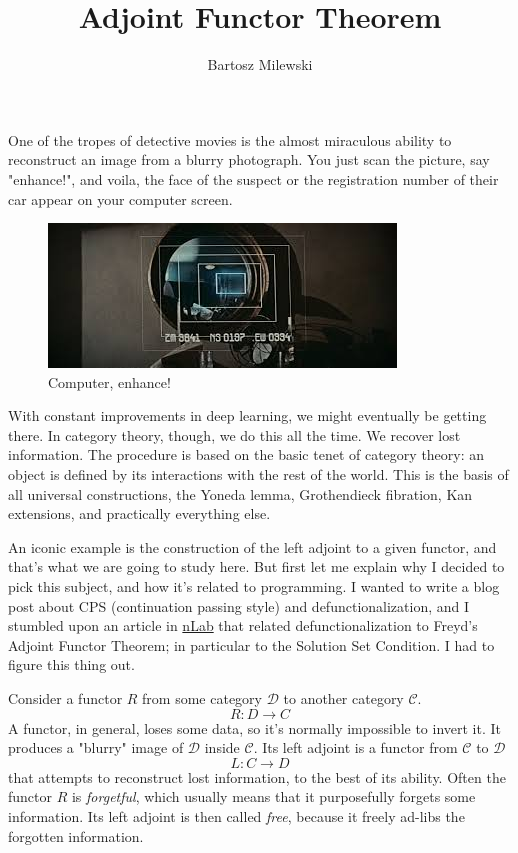 \documentclass[11pt]{amsart}
\author{Bartosz Milewski}
\title{Adjoint Functor Theorem}
\begin{document}
\maketitle{}

One of the tropes of detective movies is the almost miraculous ability to reconstruct an image from a blurry photograph. You just scan the picture,  say "enhance!", and voila, the face of the suspect or the registration number of their car appear on your computer screen. 

\begin{figure}[h]
\includegraphics{BladeRunner.jpeg}
\caption{Computer, enhance!}
\end{figure}

With constant improvements in deep learning, we might eventually be getting there. In category theory, though, we do this all the time. We recover lost information. The procedure is based on the basic tenet of category theory: an object is defined by its interactions with the rest of the world. This is the basis of all universal constructions, the Yoneda lemma, Grothendieck fibration, Kan extensions, and practically everything else. 

An iconic example is the construction of the left adjoint to a given functor, and that's what we are going to study here. But first let me explain why I decided to pick this subject, and how it's related to programming. I wanted to write a blog post about CPS (continuation passing style) and defunctionalization, and I stumbled upon an article in \href{https://ncatlab.org/nlab/show/defunctionalization}{nLab} that related defunctionalization to Freyd's Adjoint Functor Theorem; in particular to the Solution Set Condition. I had to figure this thing out.

Consider a functor $R$ from some category $\mathcal D$ to another category $\mathcal C$. 
\[R \colon D \to C \]
A functor, in general, loses some data, so it's normally impossible to invert it. It produces a "blurry" image of $\mathcal D$ inside $\mathcal C$. Its left adjoint is a functor from $\mathcal C$ to $\mathcal D$ 
\[ L \colon C \to D\]
that attempts to reconstruct lost information, to the best of its ability. Often the functor $R$ is \emph{forgetful}, which usually means that it purposefully forgets some information. Its left adjoint is then called \emph{free}, because it freely ad-libs the forgotten information. 
\end{document}
